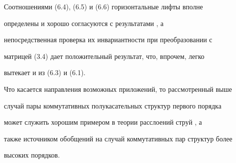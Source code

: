 Соотношениями (6.4), (6.5) и (6.6) горизонтальные лифты вполне


определены и хорошо согласуются с результатами \cite{6}, а


непосредственная проверка их инвариантности при преобразовании с


матрицей (3.4) дает положительный результат, что, впрочем, легко


вытекает и из (6.3) и (6.1).





Что касается направления возможных приложений, то рассмотренный выше


случай пары коммутативных полукасательных структур первого порядка


может служить хорошим примером в теории расслоений струй \cite{8}, а


также источником обобщений на случай коммутативных пар структур более


высоких порядков.





